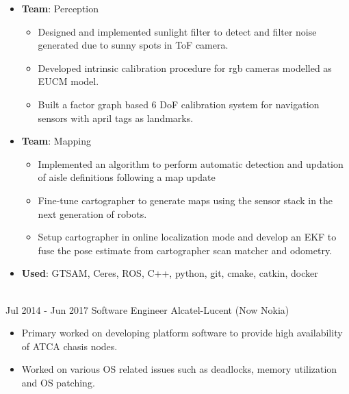 \documentclass[letterpaper]{twentysecondcv} %
\begin{document}
\begin{twenty}
{{\begin{itemize}
{\begin{itemize}
                        suite into the navigation stack.
                \end{itemize}}
            \item \textbf{Team}: Perception
                {\begin{itemize}
                    \item Designed and implemented sunlight filter to detect and filter noise generated due to sunny spots in ToF camera.
                    \item Developed intrinsic calibration procedure for rgb cameras modelled as EUCM model.
                    \item Built a factor graph based 6 DoF calibration system for navigation sensors with april tags as landmarks.
                \end{itemize}}
            \item \textbf{Team}: Mapping
                {\begin{itemize}
                    \item Implemented an algorithm to perform automatic detection and updation of aisle definitions following
                        a map update
                    \item Fine-tune cartographer to generate maps using the sensor stack in the next generation of robots.
                    \item Setup cartographer in online localization mode and develop an EKF to fuse the pose estimate from cartographer
                        scan matcher and odometry.
                \end{itemize}}
            \item \textbf{Used}: GTSAM, Ceres, ROS, C++, python, git, cmake, catkin, docker
        \end{itemize}}
    }
    \\
    \twentyitem
    {Jul 2014 -}
    {Jun 2017}
    {Software Engineer}
    {Alcatel-Lucent (Now Nokia)}
    {}
    {
        \begin{itemize}
            \item Primary worked on developing platform software to provide high availability of ATCA chasis nodes.
            \item Worked on various OS related issues such as deadlocks, memory utilization and OS patching.
        \end{itemize}
        }

\end{twenty}
\end{document}
